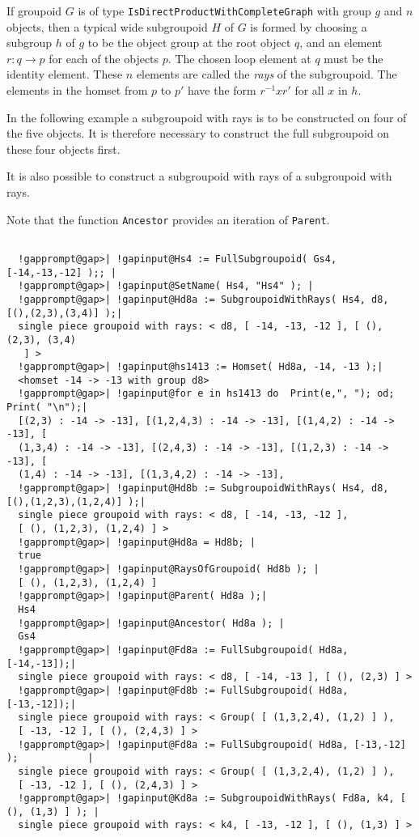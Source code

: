 \documentclass[a4paper,11pt]{report}
\begin{document}
{{{ If groupoid $G$ is of type \texttt{IsDirectProductWithCompleteGraph} with group $g$ and $n$ objects, then a typical wide subgroupoid $H$ of $G$ is formed by choosing a subgroup $h$ of $g$ to be the object group at the root object $q$, and an element $r : q \to p$ for each of the objects $p$. The chosen loop element at $q$ must be the identity element. These $n$ elements are called the  \emph{rays} of the subgroupoid. The elements in the homset from $p$ to $p'$ have the form $r^{-1}xr'$ for all $x$ in $h$. 

 In the following example a subgroupoid with rays is to be constructed on four
of the five objects. It is therefore necessary to construct the full
subgroupoid on these four objects first. 

 It is also possible to construct a subgroupoid with rays of a subgroupoid with
rays. 

 Note that the function  \texttt{Ancestor} provides an iteration of \texttt{Parent}. 

 }

 
\begin{Verbatim}[commandchars=!@|,fontsize=\small,frame=single,label=Example]
  
  !gapprompt@gap>| !gapinput@Hs4 := FullSubgroupoid( Gs4, [-14,-13,-12] );; |
  !gapprompt@gap>| !gapinput@SetName( Hs4, "Hs4" ); |
  !gapprompt@gap>| !gapinput@Hd8a := SubgroupoidWithRays( Hs4, d8, [(),(2,3),(3,4)] );|
  single piece groupoid with rays: < d8, [ -14, -13, -12 ], [ (), (2,3), (3,4)
   ] >
  !gapprompt@gap>| !gapinput@hs1413 := Homset( Hd8a, -14, -13 );|
  <homset -14 -> -13 with group d8>
  !gapprompt@gap>| !gapinput@for e in hs1413 do  Print(e,", "); od;  Print( "\n");|
  [(2,3) : -14 -> -13], [(1,2,4,3) : -14 -> -13], [(1,4,2) : -14 -> -13], [
  (1,3,4) : -14 -> -13], [(2,4,3) : -14 -> -13], [(1,2,3) : -14 -> -13], [
  (1,4) : -14 -> -13], [(1,3,4,2) : -14 -> -13], 
  !gapprompt@gap>| !gapinput@Hd8b := SubgroupoidWithRays( Hs4, d8, [(),(1,2,3),(1,2,4)] );|
  single piece groupoid with rays: < d8, [ -14, -13, -12 ],
  [ (), (1,2,3), (1,2,4) ] >
  !gapprompt@gap>| !gapinput@Hd8a = Hd8b; |
  true
  !gapprompt@gap>| !gapinput@RaysOfGroupoid( Hd8b ); |
  [ (), (1,2,3), (1,2,4) ]
  !gapprompt@gap>| !gapinput@Parent( Hd8a );|
  Hs4
  !gapprompt@gap>| !gapinput@Ancestor( Hd8a ); |
  Gs4
  !gapprompt@gap>| !gapinput@Fd8a := FullSubgroupoid( Hd8a, [-14,-13]);|
  single piece groupoid with rays: < d8, [ -14, -13 ], [ (), (2,3) ] >
  !gapprompt@gap>| !gapinput@Fd8b := FullSubgroupoid( Hd8a, [-13,-12]);|
  single piece groupoid with rays: < Group( [ (1,3,2,4), (1,2) ] ), 
  [ -13, -12 ], [ (), (2,4,3) ] >
  !gapprompt@gap>| !gapinput@Fd8a := FullSubgroupoid( Hd8a, [-13,-12] );            |
  single piece groupoid with rays: < Group( [ (1,3,2,4), (1,2) ] ), 
  [ -13, -12 ], [ (), (2,4,3) ] >
  !gapprompt@gap>| !gapinput@Kd8a := SubgroupoidWithRays( Fd8a, k4, [ (), (1,3) ] ); |
  single piece groupoid with rays: < k4, [ -13, -12 ], [ (), (1,3) ] >
  

\end{Verbatim}}}
\end{document}
